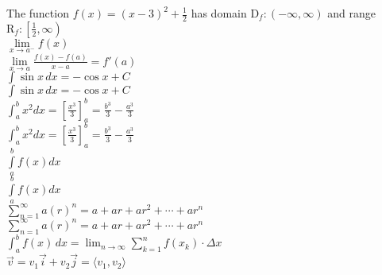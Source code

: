 \documentclass[11pt]{article}
\begin{document}
The function $f(x)=(x-3)^2+\frac{1}{2}$ has domain $\mathrm{D}_f:(-\infty,\infty)$ and range $\mathrm{R}_f:\left[\frac{1}{2},\infty\right)$\\

$\lim \limits_{x \to a^-} f(x)$\\

$\displaystyle{\lim \limits_{x \to a} \frac{f(x)-f(a)}{x-a}=f'(a)}$\\

$\int \sin x\,dx=-\cos x+C$\\

$\displaystyle{\int \sin x\,dx=-\cos x+C}$\\

$\int_{a}^{b} x^2 dx=\left[ \frac{x^3}{3} \right]_a^b=\frac{b^3}{3}-\frac{a^3}{3}$\\

$\displaystyle{\int_{a}^{b} x^2 dx=\left[ \frac{x^3}{3} \right]_a^b=\frac{b^3}{3}-\frac{a^3}{3}}$\\

$\int\limits_{a}^{b} f(x) dx$\\

$\displaystyle{\int\limits_{a}^{b} f(x) dx}$\\

$\sum \limits_{n=1}^\infty a(r)^n=a+ar+ar^2+\cdots+ar^n$\\

$\displaystyle{\sum \limits_{n=1}^\infty a(r)^n=a+ar+ar^2+\cdots+ar^n}$\\

$\displaystyle{\int_a^b f(x)\,dx=\lim_{n \to \infty} \sum \limits_{k=1}^{n} f(x_k)\cdot\Delta x}$\\

$\vec{v}=v_1 \vec{i} + v_2 \vec{j} = \langle v_1, v_2 \rangle$\\
\end{document}

